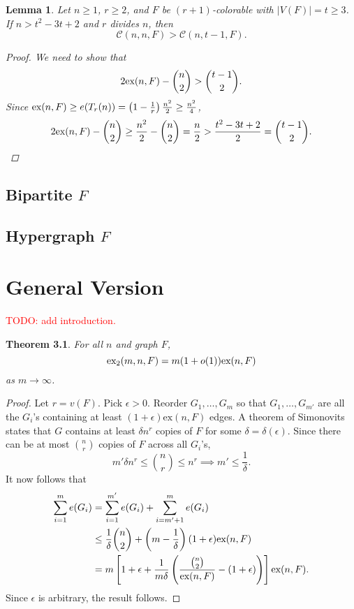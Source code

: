 \documentclass[12pt]{report}
\newtheorem{theorem}{Theorem}[chapter]
\newtheorem{lemma}[theorem]{Lemma}
\newcommand*{\ex}{\textnormal{ex}}
\newcommand*{\dex}{\textnormal{ex}_2}
\newcommand*{\con}{\mathcal{C}}
\begin{document}
\begin{lemma}
  Let $n \geq 1$, $r \geq 2$, and $F$ be $(r + 1)$-colorable with $|V(F)| = t \geq 3$. If $n > t^2 - 3t + 2$ and $r$ divides $n$, then 
  \[
    \con(n, n, F) > \con(n, t - 1, F).
  \]
  \begin{proof}
    We need to show that
    \[
      2\ex(n, F) - \binom{n}{2} > \binom{t - 1}{2}.
    \]
    Since $\ex(n, F) \geq e(T_r(n)) = \left(1 - \frac{1}{r}\right)\frac{n^2}{2} \geq \frac{n^2}{4}$,
    \[
      2\ex(n, F) - \binom{n}{2} \geq \frac{n^2}{2} - \binom{n}{2} = \frac{n}{2} > \frac{t^2 - 3t + 2}{2} = \binom{t - 1}{2}.
    \]
  \end{proof}
\end{lemma}
\section{Bipartite $F$}

\section{Hypergraph $F$}

\chapter{General Version}

\textcolor{red}{TODO: add introduction.}

\begin{theorem}
  For all $n$ and graph $F$,
  \[
    \dex(m, n, F) = m(1 + o(1))\ex(n, F)
  \]
  as $m \to \infty$.
\end{theorem}

\begin{proof}
  Let $r = v(F)$. Pick $\epsilon > 0$. Reorder $G_1, \ldots, G_m$ so that $G_1, \ldots, G_{m'}$ are all the $G_i$'s containing at least $(1 + \epsilon)\text{ex}(n, F)$ edges. A theorem of Simonovits states that $G$ contains at least $\delta n^r$ copies of $F$ for some $\delta = \delta(\epsilon)$. Since there can be at most $\binom{n}{r}$ copies of $F$ across all $G_i$'s, 
  \[
    m'\delta n^{r} \leq \binom{n}{r} \leq n^r \implies m' \leq \frac{1}{\delta}.
  \]
  It now follows that
  \begin{align*}
    \sum_{i = 1}^m e(G_i) 
    &= \sum_{i = 1}^{m'} e(G_i) + \sum_{i = m' + 1}^m e(G_i) \\
    &\leq \frac{1}{\delta}\binom{n}{2} + \left(m - \frac{1}{\delta}\right)(1 + \epsilon)\text{ex}(n, F) \\
    &= m\left[1 + \epsilon + \frac{1}{m\delta}\left(\frac{\binom{n}{2}}{\ex(n, F)} - (1 + \epsilon)\right)\right]\ex(n, F).
  \end{align*}
  Since $\epsilon$ is arbitrary, the result follows.
\end{proof}
\end{document}
